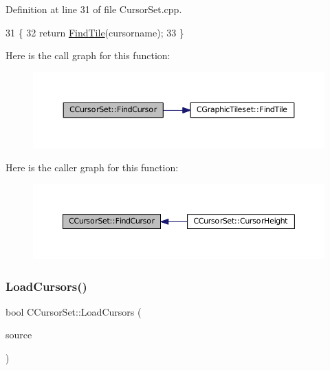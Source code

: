Definition at line 31 of file Cursor\+Set.\+cpp.


\begin{DoxyCode}
31                                                            \{
32     \textcolor{keywordflow}{return} \hyperlink{classCGraphicTileset_ab8f2c2b2f2095b17d53c3dc475d5685c}{FindTile}(cursorname);
33 \}
\end{DoxyCode}
Here is the call graph for this function\+:
\nopagebreak
\begin{figure}[H]
\begin{center}
\leavevmode
\includegraphics[width=350pt]{classCCursorSet_a6a7ee8b41e6de490a7817b3f3ce5fb9f_cgraph}
\end{center}
\end{figure}
Here is the caller graph for this function\+:
\nopagebreak
\begin{figure}[H]
\begin{center}
\leavevmode
\includegraphics[width=350pt]{classCCursorSet_a6a7ee8b41e6de490a7817b3f3ce5fb9f_icgraph}
\end{center}
\end{figure}
\hypertarget{classCCursorSet_abde01bde36a926de4d2de67e48be0cc0}{}\label{classCCursorSet_abde01bde36a926de4d2de67e48be0cc0} 
\subsubsection{\texorpdfstring{Load\+Cursors()}{LoadCursors()}}
{\footnotesize\ttfamily bool C\+Cursor\+Set\+::\+Load\+Cursors (\begin{DoxyParamCaption}\item[{std\+::shared\+\_\+ptr$<$ \hyperlink{classCDataSource}{C\+Data\+Source} $>$}]{source }\end{DoxyParamCaption})}



